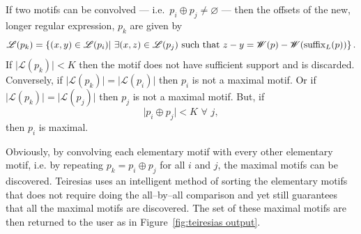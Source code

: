     If two motifs can be convolved --- i.e.\ $p_i \oplus
    p_j\neq\varnothing$ --- then the offsets of the new,
    longer regular expression, $p_k$ are given by
    \begin{equation}\label{eqn:offsetSize}
        \mathscr{L}(p_k) = \left\{(x,y) \in \mathscr{L}(p_i) \vert
            ~\exists(x,z)\in\mathscr{L}(p_j) \text{~such that~}
            z-y=\mathscr{W}(p)-\mathscr{W}(\operatorname{suffix}_L(p))\right\}.
    \end{equation}
    If $\vert \mathscr{L}(p_k) \vert < K$ then the motif does not
    have sufficient support and is discarded.  Conversely,
    if $\vert \mathscr{L}(p_k) \vert = \vert \mathscr{L}(p_i) \vert$
    then $p_i$ is not a maximal motif.  Or if $\vert \mathscr{L}(p_k) \vert = \vert \mathscr{L}(p_j) \vert$
    then $p_j$ is not a maximal motif.  But, if
    \begin{equation}\label{eqn:conv4}
            \vert p_i \oplus p_j \vert < K\text{~}\forall\text{~}j,
    \end{equation}
    then $p_i$ is maximal.


    Obviously, by convolving each elementary motif with every other
    elementary motif,
    i.e. by repeating $p_k = p_i \oplus p_j$ for all $i$ and $j$,
    the maximal motifs can be discovered.
    Teiresias uses an intelligent method of sorting the elementary
    motifs that does not require doing the all--by--all comparison
    and yet still guarantees that all the maximal motifs are
    discovered.  The set of these maximal motifs are then returned
    to the user as in Figure~\vref{fig:teiresias output}.


